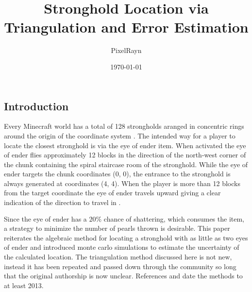\documentclass[a4paper,10pt]{article}
\title{Stronghold Location via Triangulation and Error Estimation}
\author{PixelRayn}
\date{\today}
\begin{document}
\maketitle




\begin{multicols}{2}

    \section{Introduction}
    Every Minecraft world has a total of 128 strongholds aranged in concentric rings around the origin of the coordinate system \cite{wiki_stronghold}.
    The intended way for a player to locate the closest stronghold is via the eye of ender item.
    When activated the eye of ender flies approximately 12 blocks in the direction of the north-west corner of the chunk containing the spiral staircase room of the stronghold.
    While the eye of ender targets the chunk coordinates (0, 0), the entrance to the stronghold is always generated at coordinates (4, 4).
    When the player is more than 12 blocks from the target coordinate the eye of ender travels upward giving a clear indication of the direction to travel in \cite{wiki_endereye}.

    Since the eye of ender has a $20\unit{\%}$ chance of shattering, which consumes the item, a strategy to minimize the number of pearls thrown is desirable.
    This paper reiterates the algebraic method for locating a stronghold with as little as two eyes of ender and introduced monte carlo simulations to estimate the uncertainty of the calculated location.
    The triangulation method discussed here is not new, instead it has been repeated and passed down through the community so long that the original authorship is now unclear.
    References \cite{tutorial_goosen} and \cite{tutorial_ben} date the methods to at least 2013.


\end{multicols}
\end{document}
